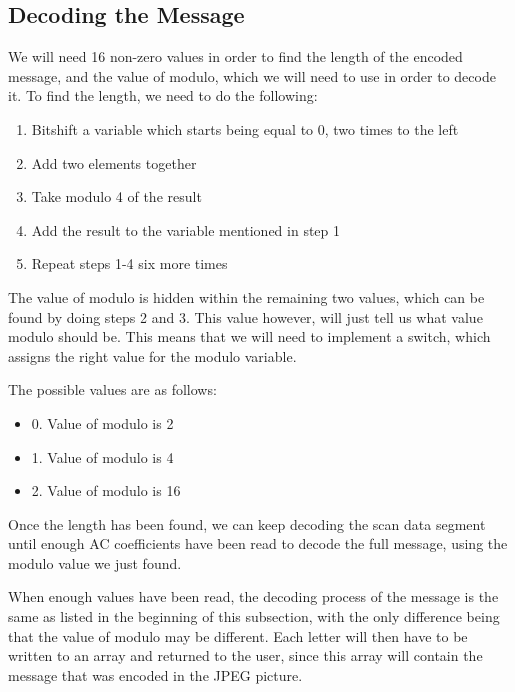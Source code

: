 \subsection{Decoding the Message}
We will need 16 non-zero values in order to find the length of the encoded message, and the value of modulo, which we will need to use in order to decode it. To find the length, we need to do the following:
\begin{enumerate}
	\item Bitshift a variable which starts being equal to 0, two times to the left
	\item Add two elements together
	\item Take modulo 4 of the result
	\item Add the result to the variable mentioned in step 1
	\item Repeat steps 1-4 six more times
\end{enumerate}
The value of modulo is hidden within the remaining two values, which can be found by doing steps 2 and 3. This value however, will just tell us what value modulo should be. This means that we will need to implement a switch, which assigns the right value for the modulo variable.

The possible values are as follows:
\begin{itemize}
	\item 0. Value of modulo is 2
	\item 1. Value of modulo is 4
	\item 2. Value of modulo is 16
\end{itemize}
Once the length has been found, we can keep decoding the scan data segment until enough AC coefficients have been read to decode the full message, using the modulo value we just found.

When enough values have been read, the decoding process of the message is the same as listed in the beginning of this subsection, with the only difference being that the value of modulo may be different. 
Each letter will then have to be written to an array and returned to the user, since this array will contain the message that was encoded in the JPEG picture.